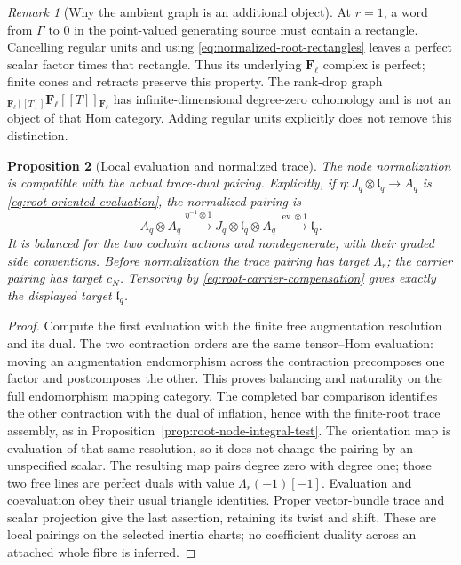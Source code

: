 \documentclass[11pt]{article}
\newtheorem{proposition}{Proposition}[section]
\theoremstyle{definition}
\theoremstyle{remark}
\newtheorem{remark}[proposition]{Remark}
\begin{document}
\begin{remark}[Why the ambient graph is an additional object]
At $r=1$, a word from $\Gamma$ to $0$ in the point-valued generating
source must contain a rectangle.  Cancelling regular units and using
\eqref{eq:normalized-root-rectangles} leaves a perfect scalar factor
times that rectangle.  Thus its underlying $\mathbf F_\ell$ complex
is perfect; finite cones and retracts preserve this property.  The
rank-drop graph ${}_{\mathbf F_\ell[[T]]}\mathbf F_\ell[[T]]{}_{\mathbf F_\ell}$
has infinite-dimensional degree-zero cohomology and is not an object
of that Hom category.  Adding regular units explicitly does not
remove this distinction.
\end{remark}

\begin{proposition}[Local evaluation and normalized trace]
\label{prop:normalized-root-pairing}
The node normalization is compatible with the actual trace-dual
pairing.  Explicitly, if $\eta:J_q\otimes\mathfrak l_q\to A_q$
is \eqref{eq:root-oriented-evaluation}, the normalized pairing is
\[
 A_q\otimes A_q\xrightarrow{\eta^{-1}\otimes1}
 J_q\otimes\mathfrak l_q\otimes A_q
       \xrightarrow{\operatorname{ev}\otimes1}\mathfrak l_q.
\]
It is balanced for the two cochain actions and nondegenerate, with
their graded side conventions.  Before normalization the trace
pairing has target $\Lambda_r$; the carrier pairing has target
$c_N$.  Tensoring by \eqref{eq:root-carrier-compensation} gives
exactly the displayed target $\mathfrak l_q$.
\end{proposition}
\begin{proof}
Compute the first evaluation with the finite free augmentation
resolution and its dual.  The two contraction orders are the same
tensor--Hom evaluation: moving an augmentation endomorphism across
the contraction precomposes one factor and postcomposes the other.
This proves balancing and naturality on the full endomorphism
mapping category.  The completed bar comparison identifies the
other contraction with the dual of inflation, hence with the
finite-root trace assembly, as in
Proposition~\ref{prop:root-node-integral-test}.  The orientation map
is evaluation of that same resolution, so it does not change the
pairing by an unspecified scalar.  The resulting map pairs degree
zero with degree one; those two free lines are perfect duals with
value $\Lambda_r(-1)[-1]$.  Evaluation and coevaluation obey their
usual triangle identities.  Proper vector-bundle trace and scalar
projection give the last assertion, retaining its twist and shift.
These are local pairings on the selected inertia charts; no
coefficient duality across an attached whole fibre is inferred.
\end{proof}
\end{document}
